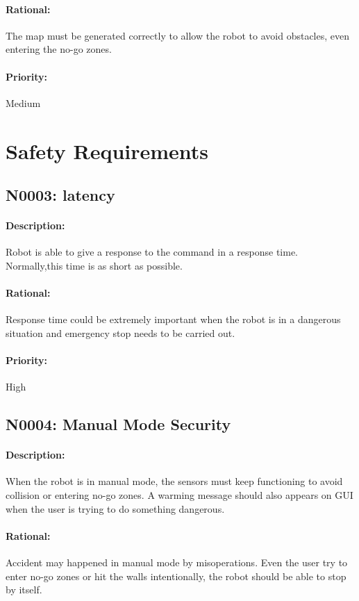 \documentclass[11pt, a4paper]{report}
\begin{document}
\paragraph{Rational:}
The map must be generated correctly to allow the robot to avoid obstacles, even entering the no-go zones.
\paragraph{Priority:}
Medium

\section{Safety Requirements}

\subsection{N0003: latency}
\paragraph{Description:}
Robot is able to give a response to the command in a response time. Normally,this time is as short as possible.
\paragraph{Rational:}
Response time could be extremely important when the robot is in a dangerous situation and emergency stop needs to be carried out.
\paragraph{Priority:}
High

\subsection{N0004: Manual Mode Security}
\paragraph{Description:}
When the robot is in manual mode, the sensors must keep functioning to avoid collision or entering no-go zones. A warming message should also appears on GUI when the user is trying to do something dangerous.
\paragraph{Rational:}
Accident may happened in manual mode by misoperations. Even the user try to enter no-go zones or hit the walls intentionally, the robot should be able to stop by itself.
\end{document}
